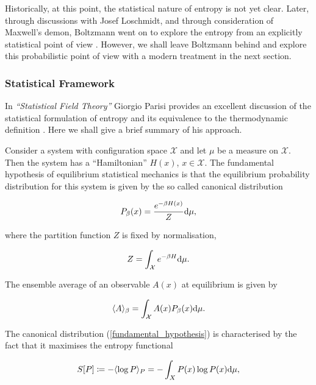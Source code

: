 Historically, at this point, the statistical nature of entropy is not yet clear. Later, through discussions with Josef Loschmidt, and through consideration of Maxwell's demon, Boltzmann went on to explore the entropy from an explicitly statistical point of view \cite{Cercignani1998-CERLBT-2}. However, we shall leave Boltzmann behind and explore this probabilistic point of view with a modern treatment in the next section.

 \subsubsection{Statistical Framework}
In \textit{``Statistical Field Theory''} Giorgio Parisi provides an excellent discussion of the statistical formulation of entropy and its equivalence to the thermodynamic definition \cite[see \S 1]{parisi1998statistical}. Here we shall give a brief summary of his approach.

Consider a system with configuration space $\mathcal{X}$ and let $\mu$ be a measure on $\mathcal{X}$. Then the system has a ``Hamiltonian'' $H(x)$, $x \in \mathcal{X}$. The fundamental hypothesis of equilibrium statistical mechanics is that the equilibrium probability distribution for this system is given by the so called canonical distribution


\begin{equation}\label{fundamental_hypothesis}
  P_\beta(x) = \frac{e^{-\beta H(x)}}{Z} \mathrm{d}\mu,
\end{equation}

where the partition function $Z$ is fixed by normalisation,

\begin{equation}
  Z = \int_\mathcal{X} e^{-\beta H} \mathrm{d}\mu.
\end{equation}

The ensemble average of an observable $A(x)$ at equilibrium is given by

\begin{equation}
  \langle A \rangle_\beta = \int_\mathcal{X} A(x)P_\beta(x) \mathrm{d}\mu.
\end{equation}

The canonical distribution (\ref{fundamental_hypothesis}) is characterised by the fact that it maximises the entropy functional

\begin{equation}\label{shannon-ent}
  S[P] \coloneqq -\langle \log P \rangle_P = -\int_X P(x)\log P(x)\mathrm{d}\mu,
\end{equation}


